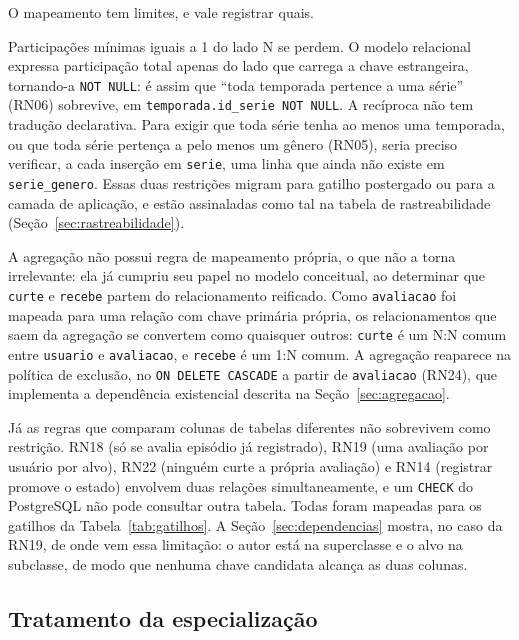 \documentclass[a4paper,12pt,oneside,openany]{book}
\newif\iforientacoes
\newcommand{\orientacao}[1]{%
    \iforientacoes
        \begin{quote}
        \small\itshape\textbf{Orientação:} #1
        \end{quote}
    \fi
}
\newcommand{\id}[1]{\texttt{#1}}
\begin{document}
O mapeamento tem limites, e vale registrar quais.

Participações mínimas iguais a 1 do lado N se perdem. O modelo relacional expressa
participação total apenas do lado que carrega a chave estrangeira, tornando-a
\id{NOT NULL}: é assim que ``toda temporada pertence a uma série'' (RN06) sobrevive,
em \id{temporada.id\_serie NOT NULL}. A recíproca não tem tradução declarativa. Para
exigir que toda série tenha ao menos uma temporada, ou que toda série pertença a pelo
menos um gênero (RN05), seria preciso verificar, a cada inserção em \id{serie}, uma
linha que ainda não existe em \id{serie\_genero}. Essas duas restrições migram para
gatilho postergado ou para a camada de aplicação, e estão assinaladas como tal na
tabela de rastreabilidade (Seção~\ref{sec:rastreabilidade}).

A agregação não possui regra de mapeamento própria, o que não a torna irrelevante:
ela já cumpriu seu papel no modelo conceitual, ao determinar que \id{curte} e
\id{recebe} partem do relacionamento reificado. Como \id{avaliacao} foi mapeada para
uma relação com chave primária própria, os relacionamentos que saem da agregação se
convertem como quaisquer outros: \id{curte} é um N:N comum entre \id{usuario} e
\id{avaliacao}, e \id{recebe} é um 1:N comum. A agregação reaparece na política de
exclusão, no \id{ON DELETE CASCADE} a partir de \id{avaliacao} (RN24), que
implementa a dependência existencial descrita na Seção~\ref{sec:agregacao}.

Já as regras que comparam colunas de tabelas diferentes não sobrevivem como
restrição. RN18 (só se avalia episódio já registrado), RN19 (uma avaliação por
usuário por alvo), RN22 (ninguém curte a própria avaliação) e RN14 (registrar promove
o estado) envolvem duas relações simultaneamente, e um \id{CHECK} do PostgreSQL não
pode consultar outra tabela. Todas foram mapeadas para os gatilhos da
Tabela~\ref{tab:gatilhos}. A Seção~\ref{sec:dependencias} mostra, no caso da RN19, de
onde vem essa limitação: o autor está na superclasse e o alvo na subclasse, de modo
que nenhuma chave candidata alcança as duas colunas.

\subsection{Tratamento da especialização}\label{sec:map-especializacao}

\orientacao{Esta subseção é obrigatória. Existem três estratégias clássicas para
mapear especialização: (a) tabela única com atributos nulos e discriminador;
(b) uma tabela por subclasse, ligada à superclasse; (c) uma tabela por subclasse
concreta, sem tabela para a superclasse. Apresentem as três, digam qual foi
adotada e por quê. A estratégia escolhida no projeto é a (b) -- justifiquem-na
considerando que (i) a superclasse possui atributos próprios relevantes
(\id{nota}, \id{texto}, \id{data\_publicacao}), (ii) curtidas e comentários
precisam referenciar a avaliação independentemente do tipo de alvo, o que exige
uma chave única compartilhada, e (iii) a estratégia (c) tornaria impossível a
referência da agregação descrita na Seção~\ref{sec:agregacao}.}
\end{document}
